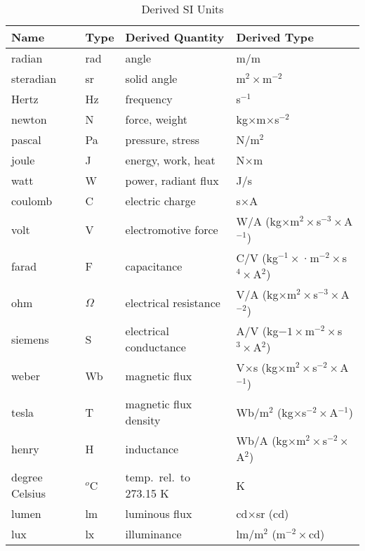 \begin{table}[h]\LLLL\LLll
  \centering
\begin{tabular}{|llll|} \hline
         Name   &      Type & Derived Quantity & Derived Type \\ \hline
         radian & rad & angle & m/m  \\ 
         steradian & sr & solid angle & m$^2\times$m$^{-2}$ \\  
         Hertz  & Hz  & frequency & s$^{-1}$ \\
         newton & N   & force, weight   & kg{$\times$}m{$\times$}s$^{-2}$ \\
         pascal & Pa & pressure, stress & N/m$^2$ \\
         joule  & J & energy, work, heat & N$\times$m \\
         watt   & W & power, radiant flux &     J/s \\
         coulomb & C & electric charge & s$\times$A \\
volt &  V & electromotive force &  W/A (kg$\times$m$^2\times$s$^{-3}\times$A$^{-1}$) \\
farad & F & capacitance & C/V (kg$^{-1}\times$·m$^{-2}\times$s$^4\times$A$^2$) \\
ohm & $\Omega$ &  electrical resistance & V/A (kg$\times$m$^2\times$s$^{−3}\times$A$^{−2}$) \\
siemens & S & electrical conductance & A/V (kg${−1}\times$m$^{−2}\times$s$^3\times$A$^2$)\\
weber & Wb & magnetic flux &  V$\times$s  (kg$\times$m$^2\times$s$^{-2}\times$A$^{-1}$)\\
tesla   & T &  magnetic flux density   & Wb/m$^2$ (kg$\times$s$^{−2}\times$A$^{-1}$) \\
henry   & H &  inductance    &   Wb/A (kg$\times$m$^2\times$s$^{-2}\times$A$^2$) \\
degree Celsius    &     $^o$C    &   temp.\ rel.\ to 273.15 K & K \\
lumen &  lm  &   luminous flux   & cd$\times$sr   (cd) \\
lux   &  lx  & illuminance   &   lm/m$^2$   (m$^{−2}\times$cd) \\ \hline
\end{tabular}  \caption{\HHHH Derived SI Units} \label{table:2}
\end{table}
\mnewfoil 
\noindent\pos{\normalsize}{\HHHH\LLLL}
 \pos{\footnotesize}{\large\HHHH}
